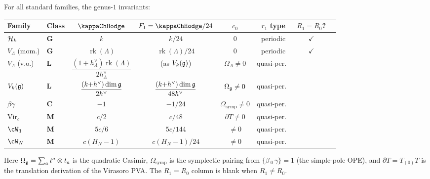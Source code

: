 \begin{computation}%
\label{comp:genus1-atlas}%
%
%
For all standard families, the genus-$1$ invariants:

\begin{center}
\small
\renewcommand{\arraystretch}{1.4}
\begin{tabular}{llcccccc}
\toprule
\textbf{Family} & \textbf{Class}
& $\kappaChHodge$ & $F_1 = \kappaChHodge/24$
& $c_0$ & \textbf{$r_1$ type}
& $R_1 {=} R_0$? \\
\midrule
$\mathcal{H}_k$ & $\mathbf{G}$
 & $k$ & $k/24$
 & $0$ & periodic
 & $\checkmark$ \\[2pt]
$V_\Lambda$ (mom.) & $\mathbf{G}$
 & $\operatorname{rk}(\Lambda)$
 & $\operatorname{rk}(\Lambda)/24$
 & $0$ & periodic
 & $\checkmark$ \\[2pt]
$V_\Lambda$ (v.o.) & $\mathbf{L}$
 & $\dfrac{(1{+}h^\vee_\Lambda)\operatorname{rk}(\Lambda)}{2h^\vee_\Lambda}$
 & (as $V_k(\mathfrak{g})$)
 & $\Omega_\Lambda \ne 0$ & quasi-per.\
 & \\[4pt]
$V_k(\mathfrak{g})$ & $\mathbf{L}$
 & $\dfrac{(k{+}h^\vee)\dim\mathfrak{g}}{2h^\vee}$
 & $\dfrac{(k{+}h^\vee)\dim\mathfrak{g}}{48h^\vee}$
 & $\Omega_{\mathfrak{g}} \ne 0$ & quasi-per.\
 & \\[4pt]
$\beta\gamma$ & $\mathbf{C}$
 & $-1$
 & $-1/24$
 & $\Omega_{\mathrm{symp}} \ne 0$ & quasi-per.\
 & \\[2pt]
$\mathrm{Vir}_c$ & $\mathbf{M}$
 & $c/2$
 & $c/48$
 & $\partial T \ne 0$ & quasi-per.\
 & \\[2pt]
$\cW_3$ & $\mathbf{M}$
 & $5c/6$
 & $5c/144$
 & $\ne 0$ & quasi-per.\
 & \\[2pt]
$\cW_N$ & $\mathbf{M}$
 & $c(H_N{-}1)$
 & $c(H_N{-}1)/24$
 & $\ne 0$ & quasi-per.\
 & \\
\bottomrule
\end{tabular}
\end{center}
Here $\Omega_{\mathfrak{g}} = \sum_a t^a \otimes t_a$ is the
quadratic Casimir,
$\Omega_{\mathrm{symp}}$ is the symplectic pairing
from $\{\beta \,{}_0\, \gamma\} = 1$
\textup{(}the simple-pole OPE\textup{)},
and $\partial T = T_{(0)}T$ is the translation
derivation of the Virasoro PVA\@. The $R_1 = R_0$
column is blank when $R_1 \ne R_0$.
\end{computation}

